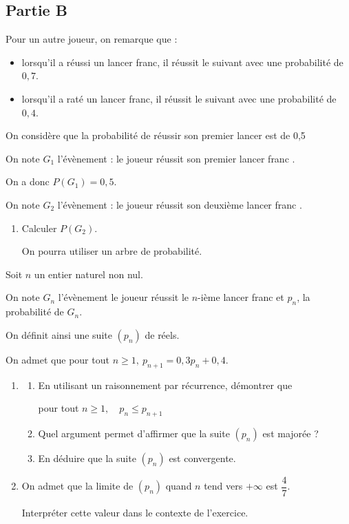 \documentclass[10pt]{article}
\begin{document}
\subsection*{Partie B}

Pour un autre joueur, on remarque que :
\begin{itemize}
	\item lorsqu'il a réussi un lancer franc, il réussit le suivant avec une probabilité de $0,7$.
	\item lorsqu'il a raté un lancer franc, il réussit le suivant avec une probabilité de $0,4$.
\end{itemize}

On considère que la probabilité de réussir son premier lancer est de  0,5

On note $G_1$ l'évènement : \og le joueur réussit son premier lancer franc \fg.

On a donc $P(G_1) = 0,5$.

On note $G_2$ l'évènement : \og le joueur réussit son deuxième lancer franc \fg .

\medskip

\begin{enumerate}
	\item Calculer $P(G_2)$.

	On pourra utiliser un arbre de probabilité.
\end{enumerate}

Soit $n$ un entier naturel non nul.

On note $G_n$ l'évènement \og le joueur réussit le $n$-ième lancer franc \fg{} et $p_n$, la
probabilité de $G_n$.

On définit ainsi une suite $(p_n)$ de réels.

On admet que pour tout $n \geqslant 1,\: p_{n+1} = 0,3p_n + 0,4$.
\begin{enumerate}[resume]
	\item
	\begin{enumerate}
		\item En utilisant un raisonnement par récurrence, démontrer que

		\begin{center}pour tout $n \geqslant 1,\quad p_n \leqslant p_{n+1}$ \end{center}

		\item Quel argument permet d'affirmer que la suite $(p_n)$ est majorée ?
		\item En déduire que la suite $(p_n)$ est convergente.
	\end{enumerate}
	\item On admet que la limite de $(p_n)$ quand $n$ tend vers $+\infty$ est $\dfrac47$.

	Interpréter cette valeur dans le contexte de l'exercice.
\end{enumerate}
\end{document}
